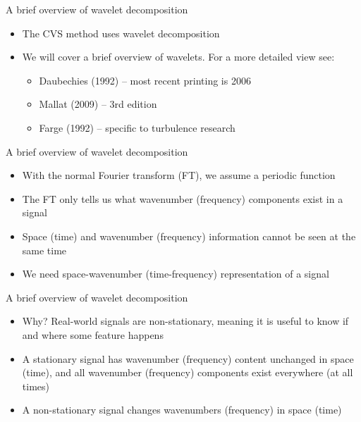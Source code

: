 \begin{frame}{A brief overview of wavelet decomposition}

\begin{itemize}
	\item The CVS method uses wavelet decomposition
	\item We will cover a brief overview of wavelets.  For a more detailed view see: 
	\begin{itemize}
		\item Daubechies (1992) -- most recent printing is 2006
		\item Mallat (2009) -- 3rd edition
		\item Farge (1992) -- specific to turbulence research
	\end{itemize}
\end{itemize}

\end{frame}



\begin{frame}{A brief overview of wavelet decomposition}

\begin{itemize}
	\item With the normal Fourier transform (FT), we assume a periodic function
	\item The FT only tells us what wavenumber (frequency) components exist in a signal
	\item Space (time) and wavenumber (frequency) information cannot be seen at the same time
	\item We need space-wavenumber (time-frequency) representation of a signal
\end{itemize}
\end{frame}


\begin{frame}{A brief overview of wavelet decomposition}

\begin{itemize}
	\item Why? Real-world signals are non-stationary, meaning it is useful to know if and where some feature happens
	\item A stationary signal has wavenumber (frequency) content unchanged in space (time), and all wavenumber (frequency) components exist everywhere (at all times)
	\item A non-stationary signal changes wavenumbers (frequency) in space (time)
\end{itemize}
\end{frame}

